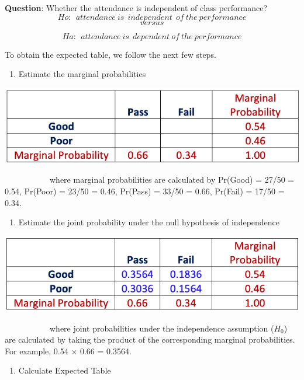 \documentclass[
]{book}
\providecommand{\tightlist}{%
  \setlength{\itemsep}{0pt}\setlength{\parskip}{0pt}}
\begin{document}
\textbf{Question}: Whether the attendance is independent of class performance?
\[
Ho: \ \ attendance \ is \ \ independent \ \ of \ the \ performance
\]
\[versus\]

\[
Ha: \ \ attendance \ is  \ \ dependent \ of \ the \ performance
\]

To obtain the expected table, we follow the next few steps.

\begin{enumerate}
\def\labelenumi{\arabic{enumi}.}
\tightlist
\item
  Estimate the marginal probabilities
\end{enumerate}

\begin{center}\includegraphics[width=0.5\linewidth]{week13/marginalTable} \end{center}

~~~~~~~~~~~where marginal probabilities are calculated by Pr(Good) = 27/50 = 0.54, Pr(Poor) = 23/50 = 0.46, Pr(Pass) = 33/50 = 0.66, Pr(Fail) = 17/50 = 0.34.

\begin{enumerate}
\def\labelenumi{\arabic{enumi}.}
\setcounter{enumi}{1}
\tightlist
\item
  Estimate the joint probability under the null hypothesis of independence
\end{enumerate}

\begin{center}\includegraphics[width=0.5\linewidth]{week13/jointProb} \end{center}

~~~~~~~~~~~where joint probabilities under the independence assumption (\(H_0\)) are calculated by taking the product of the corresponding marginal probabilities. For example, 0.54 \(\times\) 0.66 = 0.3564.

\begin{enumerate}
\def\labelenumi{\arabic{enumi}.}
\setcounter{enumi}{2}
\tightlist
\item
  Calculate Expected Table
\end{enumerate}
\end{document}
